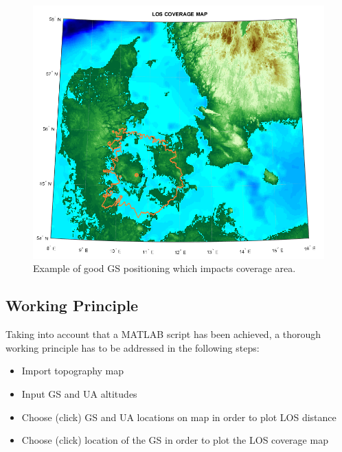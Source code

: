 \begin{figure}[H]
	\centering
	\includegraphics[scale=0.67]{figures/los_odense.png}
	\caption{Example of good GS positioning which impacts coverage area.}
   	\label{fig:los_odense}
\end{figure}

\subsection*{Working Principle}
Taking into account that a MATLAB script has been achieved, a thorough working principle has to be addressed in the following steps:
\begin{itemize}
	\item Import topography map 
	\item Input GS and UA altitudes
	\item Choose (click) GS and UA locations on map in order to plot LOS distance
	\item Choose (click) location of the GS in order to plot the LOS coverage map
\end{itemize}